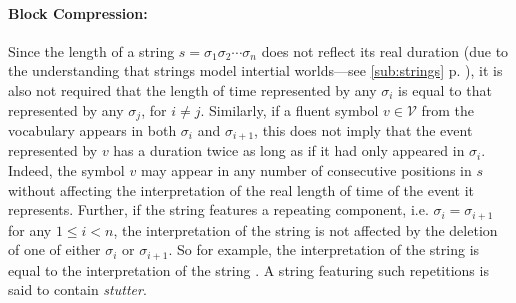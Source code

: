 \documentclass[a4paper,12pt,leqno]{article}
\newcommand{\vph}[1]{\vphantom{#1}}
\newcommand{\ebox}[1]{\fbox{$\vph{'(),}#1$}}
\newcommand{\EventString}[1]{
	\renewcommand*{\do}[1]{\ebox{##1}}%
	\PipeParser{#1}
}
\begin{document}
\paragraph{Block Compression:}
Since the length of a string $s = \sigma_1\sigma_2\cdots\sigma_n$ does not reflect its real duration (due to the understanding that strings model intertial worlds---see \cref{sub:strings} p. \pageref{sub:strings}), it is also not required that the length of time represented by any $\sigma_i$ is equal to that represented by any $\sigma_j$, for $i \neq j$. Similarly, if a fluent symbol $v \in \mathcal{V}$ from the vocabulary appears in both $\sigma_i$ and $\sigma_{i+1}$, this does not imply that the event represented by $v$ has a duration twice as long as if it had only appeared in $\sigma_i$. Indeed, the symbol $v$ may appear in any number of consecutive positions in $s$ without affecting the interpretation of the real length of time of the event it represents. Further, if the string features a repeating component, i.e. $\sigma_i = \sigma_{i+1}$ for any $1 \le i < n$, the interpretation of the string is not affected by the deletion of one of either $\sigma_i$ or $\sigma_{i+1}$. So for example, the interpretation of the string \EventString{a|a|a,b|b|b} is equal to the interpretation of the string \EventString{a|a,b|b}. A string featuring such repetitions is said to contain \textit{stutter}.
\end{document}
